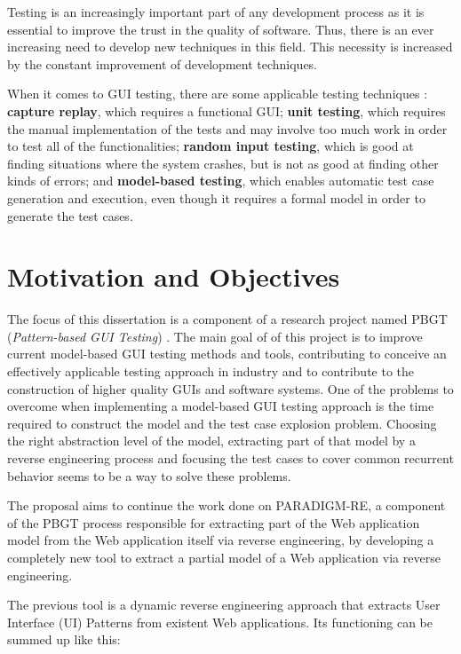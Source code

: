 Testing is an increasingly important part of any development process as it is essential to improve the trust in the quality of software. Thus, there is an ever increasing need to develop new techniques in this field. This necessity is increased by the constant improvement of development techniques.

When it comes to GUI testing, there are some applicable testing techniques \cite{memon2002gui}: \textbf{capture replay}, which requires a functional GUI; \textbf{unit testing}, which requires the manual implementation of the tests and may involve too much work in order to test all of the functionalities; \textbf{random input testing}, which is good at finding situations where the system crashes, but is not as good at finding other kinds of errors; and \textbf{model-based testing}, which enables automatic test case generation and execution, even though it requires a formal model in order to generate the test cases.

\section{Motivation and Objectives} \label{sec:goals}

The focus of this dissertation is a component of a research project named PBGT (\textit{Pattern-based GUI Testing}) \cite{moreira2013pattern}. The main goal of of this project is to improve current model-based GUI testing methods and tools, contributing to conceive an effectively applicable testing approach in industry and to contribute to the construction of higher quality GUIs and software systems. One of the problems to overcome when implementing a model-based GUI testing approach is the time required to construct the model and the test case explosion problem. Choosing the right abstraction level of the model, extracting part of that model by a reverse engineering process and focusing the test cases to cover common recurrent behavior seems to be a way to solve these problems.

The proposal aims to continue the work done on PARADIGM-RE, a component of the PBGT process responsible for extracting part of the Web application model from the Web application itself via reverse engineering, by developing a completely new tool to extract a partial model of a Web application via reverse engineering.

The previous tool \cite{nabuco2013inferring,nabuco2014inferring} is a dynamic reverse engineering approach that extracts User Interface (UI) Patterns from existent Web applications. Its functioning can be summed up like this: 

